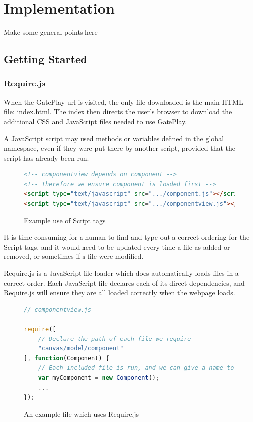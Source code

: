 \chapter{Implementation}
Make some general points here

\section{Getting Started}

\subsection{Require.js}
When the GatePlay url is visited, the only file downloaded is the main HTML file: index.html. The index then directs the user's browser to download the additional CSS and JavaScript files needed to use GatePlay.

A JavaScript script may used methods or variables defined in the global namespace, even if they were put there by another script, provided that the script has already been run.

\begin{figure}[H]
\begin{lstlisting}[language=html]
<!-- componentview depends on component -->
<!-- Therefore we ensure component is loaded first -->
<script type="text/javascript" src=".../component.js"></script>
<script type="text/javascript" src=".../componentview.js"></script>
\end{lstlisting}
\caption{Example use of Script tags}
\end{figure}

It is time consuming for a human to find and type out a correct ordering for the Script tags, and it would need to be updated every time a file as added or removed, or sometimes if a file were modified.

Require.js is a JavaScript file loader which does automatically loads files in a correct order. Each JavaScript file declares each of its direct dependencies, and Require.js will ensure they are all loaded correctly when the webpage loads.

\begin{figure}[H]
\begin{lstlisting}[language=JavaScript]
// componentview.js

require([
	// Declare the path of each file we require	
	"canvas/model/component"
], function(Component) {
	// Each included file is run, and we can give a name to whatever it returns if desired
	var myComponent = new Component();
	...
});
\end{lstlisting}
\caption{An example file which uses Require.js}
\end{figure}

